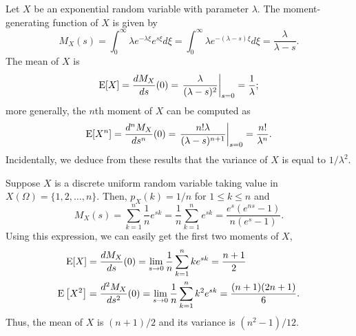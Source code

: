 \begin{example}
Let $X$ be an exponential random variable with parameter $\lambda$.
The moment-generating function of $X$ is given by
\begin{equation*}
M_X (s) = \int_0^{\infty} \lambda e^{-\lambda \xi} e^{s\xi} d\xi
= \int_0^{\infty} \lambda e^{-(\lambda-s) \xi} d\xi
= \frac{\lambda}{\lambda - s} .
\end{equation*}
The mean of $X$ is
\begin{equation*}
\mathrm{E} [X] = \frac{d M_X }{ds} (0)
= \left. \frac{\lambda}{(\lambda - s)^2} \right|_{s=0}
= \frac{1}{\lambda} ;
\end{equation*}
more generally, the $n$th moment of $X$ can be computed as
\begin{equation*}
\mathrm{E} [X^n] = \frac{d^n M_X }{ds^n} (0)
= \left. \frac{n! \lambda}{(\lambda - s)^{n+1}} \right|_{s=0}
= \frac{n!}{\lambda^n} .
\end{equation*}
Incidentally, we deduce from these results that the variance of $X$ is equal to $1/\lambda^2$.
\end{example}

\begin{example}
Suppose $X$ is a discrete uniform random variable taking value in $X(\Omega) = \{ 1, 2, \ldots, n \}$.
Then, $p_X(k) = 1/n$ for $1 \leq k \leq n$ and
\begin{equation*}
M_X(s) = \sum_{k = 1}^n \frac{1}{n} e^{sk}
= \frac{1}{n} \sum_{k = 1}^n e^{sk}
= \frac {e^s (e^{ns} - 1)} {n (e^s - 1)} .
\end{equation*}
Using this expression, we can easily get the first two moments of $X$,
\begin{align*}
\mathrm{E} [X] &= \frac{d M_X}{ds} (0)
= \lim_{s \rightarrow 0} \frac{1}{n} \sum_{k = 1}^n k e^{sk} = \frac{n + 1}{2} \\
\mathrm{E} \left[ X^2 \right] &= \frac{d^2 M_X}{ds^2} (0)
= \lim_{s \rightarrow 0} \frac{1}{n} \sum_{k=1}^n k^2 e^{sk}
= \frac {(n + 1)(2n + 1)}{6} .
\end{align*}
Thus, the mean of $X$ is $(n+1)/2$ and its variance is $(n^2 - 1)/12$.
\end{example}

